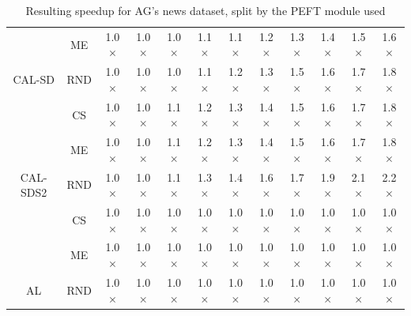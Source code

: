 \begin{table}[htbp]
\begin{subtable}{\linewidth}
\begin{tabular}{c|c|cccccccccc}
 & ME & 1.0$\times$ & 1.0$\times$ & 1.0$\times$ & 1.1$\times$ & 1.1$\times$ & 1.2$\times$ & 1.3$\times$ & 1.4$\times$ & 1.5$\times$ & 1.6$\times$\\

\multirow{-3}{*}{\raggedright\arraybackslash CAL-SD} & RND & 1.0$\times$ & 1.0$\times$ & 1.0$\times$ & 1.1$\times$ & 1.2$\times$ & 1.3$\times$ & 1.5$\times$ & 1.6$\times$ & 1.7$\times$ & 1.8$\times$\\
\midrule
 & CS & 1.0$\times$ & 1.0$\times$ & 1.1$\times$ & 1.2$\times$ & 1.3$\times$ & 1.4$\times$ & 1.5$\times$ & 1.6$\times$ & 1.7$\times$ & 1.8$\times$\\

 & ME & 1.0$\times$ & 1.0$\times$ & 1.1$\times$ & 1.2$\times$ & 1.3$\times$ & 1.4$\times$ & 1.5$\times$ & 1.6$\times$ & 1.7$\times$ & 1.8$\times$\\

\multirow{-3}{*}{\raggedright\arraybackslash CAL-SDS2} & RND & 1.0$\times$ & 1.0$\times$ & 1.1$\times$ & 1.3$\times$ & 1.4$\times$ & 1.6$\times$ & 1.7$\times$ & 1.9$\times$ & 2.1$\times$ & 2.2$\times$\\
\midrule
 & CS & 1.0$\times$ & 1.0$\times$ & 1.0$\times$ & 1.0$\times$ & 1.0$\times$ & 1.0$\times$ & 1.0$\times$ & 1.0$\times$ & 1.0$\times$ & 1.0$\times$\\

 & ME & 1.0$\times$ & 1.0$\times$ & 1.0$\times$ & 1.0$\times$ & 1.0$\times$ & 1.0$\times$ & 1.0$\times$ & 1.0$\times$ & 1.0$\times$ & 1.0$\times$\\

\multirow{-3}{*}{\raggedright\arraybackslash AL} & RND & 1.0$\times$ & 1.0$\times$ & 1.0$\times$ & 1.0$\times$ & 1.0$\times$ & 1.0$\times$ & 1.0$\times$ & 1.0$\times$ & 1.0$\times$ & 1.0$\times$\\
\bottomrule
\end{tabular}
\end{subtable}
\caption{Resulting speedup for AG's news dataset, split by the PEFT module used}
\label{tab:speedup_short_agnews_10}
\end{table}
